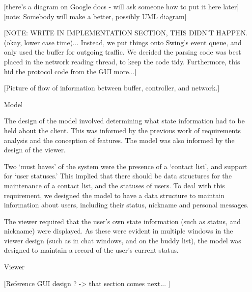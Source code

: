 [there's a diagram on Google docs - will ask someone how to put it here later]
[note: Somebody will make a better, possibly UML diagram]

[NOTE: WRITE IN IMPLEMENTATION SECTION, THIS DIDN'T HAPPEN. (okay, lower case time)... Instead, we put things onto Swing's event queue, and only used the buffer for outgoing traffic. We decided the parsing code was best placed in the network reading thread, to keep the code tidy. Furthermore, this hid the protocol code from the GUI more...]

[Picture of flow of information between buffer, controller, and network.]

Model

The design of the model involved determining what state information had to be held about the client. This was informed by the previous work of requirements analysis and the conception of features. The model was also informed by the design of the viewer.

Two `must haves' of the system were the presence of a `contact list', and support for `user statuses.' This implied that there should be data structures for the maintenance of a contact list, and the statuses of users. To deal with this requirement, we designed the model to have a data structure to maintain information about users, including their status, nickname and personal messages. 

The viewer required that the user's own state information (such as status, and nickname) were displayed. As these were evident in multiple windows in the viewer design (such as in chat windows, and on the buddy list), the model was designed to maintain a record of the user's current status. 

Viewer

[Reference GUI design ? -> that section comes next... ]


\subsubsection{}






